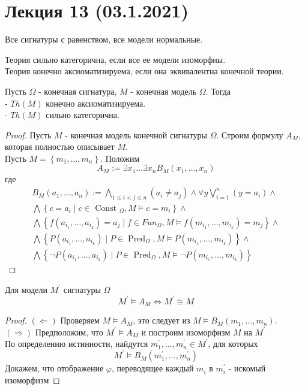 \section{Лекция 13 (03.1.2021)}

Все сигнатуры с равенством, все модели нормальные.
\begin{defn}
Теория сильно категорична, если все ее модели изоморфны.\\
Теория конечно аксиоматизируема, если она эквивалентна конечной теории.
\end{defn}

\begin{theo}
Пусть $\Omega$ - конечная сигнатура, $M$ - конечная модель $\Omega$. Тогда\\
- $Th(M)$ конечно аксиоматизируема.\\
- $Th(M)$ сильно категорична.
\end{theo}
\begin{proof}
Пусть $M$ - конечная модель конечной сигнатуры $\Omega$. Строим формулу $A_{M}$, которая полностью описывает $M$.\\
Пусть $M = \left\{m_{1}, \ldots, m_{n}\right\} $. Положим
$$
A_{M} := \exists x_{1} \ldots \exists x_{n} B_{M}\left(x_{1}, \ldots, x_{n}\right)
$$
где
$$
\begin{array}{c}
B_{M}\left(a_{1}, \ldots, a_{n}\right):=\bigwedge_{1 \leq i<j \leq n}\left(a_{i} \neq a_{j}\right) \wedge \forall y \bigvee_{i=1}^{n}\left(y=a_{i}\right) \wedge \\
\bigwedge\left\{c=a_{i} \mid c \in \text { Const }_{\Omega}, M \vDash c=m_{i}\right\} \wedge \\
\bigwedge\left\{f\left(a_{i_{1}}, \ldots, a_{i_{k}}\right)=a_{j} \mid f \in F u n_{\Omega}, M \vDash f\left(m_{i_{1}}, \ldots, m_{i_{k}}\right)=m_{j}\right\} \wedge \\
\bigwedge\left\{P\left(a_{i_{1}}, \ldots, a_{i_{k}}\right) \mid P \in \operatorname{Pred}_{\Omega}, M \vDash P\left(m_{i_{1}}, \ldots, m_{i_{k}}\right)\right\} \wedge \\
\bigwedge\left\{\neg P\left(a_{i_{1}}, \ldots, a_{i_{k}}\right) \mid P \in \operatorname{Pred}_{\Omega}, M \vDash \neg P\left(m_{i_{1}}, \ldots, m_{i_{k}}\right)\right\}
\end{array}
$$
\end{proof}
\begin{lem}
Для модели $M^{\prime}$ сигнатуры $\Omega$
$$
M^{\prime} \vDash A_{M} \Leftrightarrow M^{\prime} \cong M
$$
\end{lem}
\begin{proof}
$(\Leftarrow)$ Проверяем $M \vDash A_{M}$, это следует из $M \vDash B_{M}\left(m_{1}, \ldots, m_{n}\right)$.\\
$(\Rightarrow)$ Предположим, что $M^{\prime} \vDash A_{M}$ и построим изоморфизм $M$ на $M^{\prime}$\\
По определению истинности, найдутся $m_{1}^{\prime}, \ldots, m_{n}^{\prime} \in M^{\prime}$, для которых
$$
M^{\prime} \vDash B_{M}\left(m_{1}^{\prime}, \ldots, m_{n}^{\prime}\right)
$$
Докажем, что отображение $\varphi$, переводящее каждый $m_{i}$ в $m_{i}^{\prime}$ - искомый изоморфизм
\end{proof}
